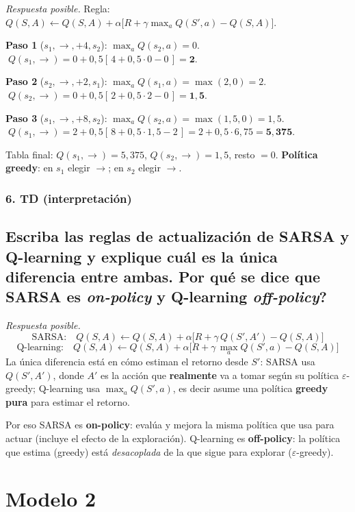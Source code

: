 \documentclass[11pt, a4paper]{article}
\newcommand{\pregunta}[1]{\subsection{#1}}
\newcommand{\eje}[1]{\subsubsection{#1}}
\begin{document}
\begin{respuesta}
\textit{Respuesta posible.} Regla: $Q(S,A)\leftarrow Q(S,A) + \alpha\big[R + \gamma\max_a Q(S',a) - Q(S,A)\big]$.

\textbf{Paso 1} ($s_1,\rightarrow,+4,s_2$): $\max_a Q(s_2,a)=0$.
$\;Q(s_1,\rightarrow)=0+0{,}5[\,4+0{,}5\cdot 0-0\,]=\mathbf{2}$.

\textbf{Paso 2} ($s_2,\rightarrow,+2,s_1$): $\max_a Q(s_1,a)=\max(2,0)=2$.
$\;Q(s_2,\rightarrow)=0+0{,}5[\,2+0{,}5\cdot 2-0\,]=\mathbf{1{,}5}$.

\textbf{Paso 3} ($s_1,\rightarrow,+8,s_2$): $\max_a Q(s_2,a)=\max(1{,}5,0)=1{,}5$.
$\;Q(s_1,\rightarrow)=2+0{,}5[\,8+0{,}5\cdot 1{,}5-2\,]=2+0{,}5\cdot 6{,}75=\mathbf{5{,}375}$.

Tabla final: $Q(s_1,\rightarrow)=5{,}375$, $Q(s_2,\rightarrow)=1{,}5$, resto $=0$.
\textbf{Pol\'itica greedy}: en $s_1$ elegir $\rightarrow$; en $s_2$ elegir $\rightarrow$.
\end{respuesta}

\eje{6. TD (interpretaci\'on)}
\pregunta{Escriba las reglas de actualizaci\'on de \textbf{SARSA} y \textbf{Q-learning} y explique cu\'al es la \'unica diferencia entre ambas. \textquestiondown Por qu\'e se dice que SARSA es \emph{on-policy} y Q-learning \emph{off-policy}?}

\begin{respuesta}
\textit{Respuesta posible.}
\[
\text{SARSA:}\quad Q(S,A)\leftarrow Q(S,A)+\alpha\big[R+\gamma\,Q(S',A')-Q(S,A)\big]
\]
\[
\text{Q-learning:}\quad Q(S,A)\leftarrow Q(S,A)+\alpha\big[R+\gamma\,\max_a Q(S',a)-Q(S,A)\big]
\]
La \'unica diferencia est\'a en c\'omo estiman el retorno desde $S'$: SARSA usa $Q(S',A')$, donde $A'$ es la acci\'on que \textbf{realmente} va a tomar seg\'un su pol\'itica $\varepsilon$-greedy; Q-learning usa $\max_a Q(S',a)$, es decir asume una pol\'itica \textbf{greedy pura} para estimar el retorno.

Por eso SARSA es \textbf{on-policy}: eval\'ua y mejora la misma pol\'itica que usa para actuar (incluye el efecto de la exploraci\'on). Q-learning es \textbf{off-policy}: la pol\'itica que estima (greedy) est\'a \emph{desacoplada} de la que sigue para explorar ($\varepsilon$-greedy).
\end{respuesta}

\section{Modelo 2}
\end{document}
